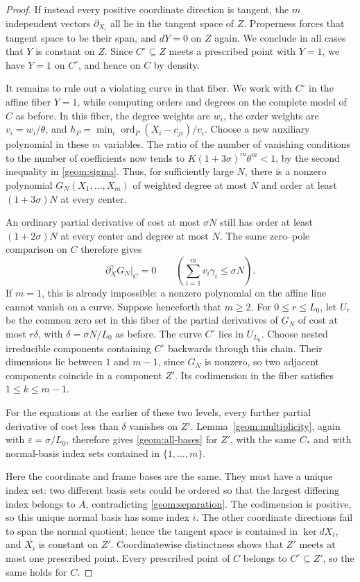 \begin{proof}
If instead every positive coordinate direction is tangent, the $m$
independent vectors $\partial_{X_i}$ all lie in the tangent space of
$Z$. Properness forces that tangent space to be their span, and
$dY=0$ on $Z$ again. We conclude in all cases that $Y$ is constant
on $Z$. Since $C^\circ\subseteq Z$ meets a prescribed point with
$Y=1$, we have $Y=1$ on $C^\circ$, and hence on $C$ by density.

It remains to rule out a violating curve in that fiber. We work with
$C^\circ$ in the affine fiber $Y=1$, while computing orders and degrees
on the complete model of $C$ as before. In this fiber, the degree weights
are $w_i$, the order weights are $v_i=w_i/\theta$,
and $h_P=\min_i\operatorname{ord}_P(X_i-c_{ji})/v_i$.
Choose a new auxiliary polynomial in these $m$ variables. The ratio of
the number of vanishing conditions to the number of coefficients now
tends to $K(1+3\sigma)^m\theta^m<1$, by the second inequality
in \eqref{geom:sigma}. Thus, for sufficiently large $N$, there is a
nonzero polynomial $G_N(X_1,\ldots,X_m)$ of weighted degree at most $N$
and order at least $(1+3\sigma)N$ at every center.

An ordinary partial derivative of cost at most $\sigma N$ still has
order at least $(1+2\sigma)N$ at every center and degree at most $N$.
The same zero--pole comparison on $C$ therefore gives
\[
 \partial_X^\gamma G_N\big|_C=0
 \qquad\left(\sum_{i=1}^m v_i\gamma_i\le\sigma N\right).
\]
If $m=1$, this is already impossible: a nonzero polynomial on the affine
line cannot vanish on a curve. Suppose henceforth that $m\ge2$. For
$0\le r\le L_0$, let $U_r$ be the common zero set in this fiber of the
partial derivatives of $G_N$ of cost at most $r\delta$, with
$\delta=\sigma N/L_0$ as before. The curve $C^\circ$ lies in $U_{L_0}$. Choose
nested irreducible components containing $C^\circ$ backwards through this
chain. Their dimensions lie between $1$ and $m-1$, since $G_N$ is
nonzero, so two adjacent components coincide in a component $Z'$.
Its codimension in the fiber satisfies $1\le k\le m-1$.

For the equations at the earlier of these two levels, every further
partial derivative of cost less than $\delta$ vanishes on $Z'$.
Lemma~\ref{geom:multiplicity}, again with $\varepsilon=\sigma/L_0$,
therefore gives \eqref{geom:all-bases} for $Z'$, with the same $C_*$
and with normal-basis index sets contained in $\{1,\ldots,m\}$.

Here the coordinate and frame bases are the same. They must have a
unique index set: two different basis sets could be ordered so that
the largest differing index belongs to $A$, contradicting
\eqref{geom:separation}. The codimension is positive, so this unique
normal basis has some index $i$. The other coordinate directions
fail to span the normal quotient; hence the tangent space is
contained in $\ker dX_i$, and $X_i$ is constant on $Z'$.
Coordinatewise distinctness shows that $Z'$ meets at most one prescribed
point. Every prescribed point of $C$ belongs to $C^\circ\subseteq Z'$,
so the same holds for $C$.


\end{proof}
